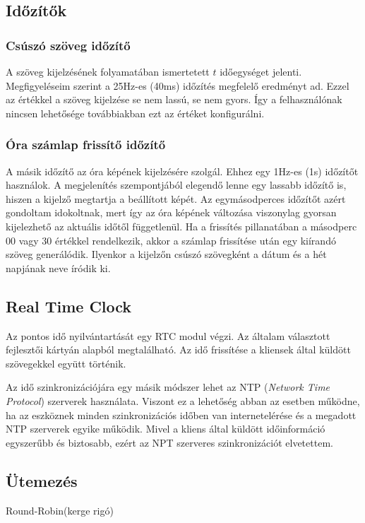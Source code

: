 \documentclass[a4paper, 12pt]{article}
\begin{document}
\subsection{Időzítők}

\subsubsection{Csúszó szöveg időzítő}
A szöveg kijelzésének folyamatában ismertetett $t$ időegységet jelenti. Megfigyeléseim szerint a 25Hz-es (40ms) időzítés megfelelő eredményt ad. Ezzel az értékkel a szöveg kijelzése se nem lassú, se nem gyors. Így a felhasználónak nincsen lehetősége továbbiakban ezt az értéket konfigurálni.

\subsubsection{Óra számlap frissítő időzítő}
A másik időzítő az óra képének kijelzésére szolgál. Ehhez egy 1Hz-es (1s) időzítőt használok. A megjelenítés szempontjából elegendő lenne egy lassabb időzítő is, hiszen a kijelző megtartja a beállított képét. Az egymásodperces időzítőt azért gondoltam idokoltnak, mert így az óra képének változása viszonylag gyorsan kijelezhető az aktuális időtől függetlenül.
Ha a frissítés pillanatában a másodperc 00 vagy 30 értékkel rendelkezik, akkor a számlap frissítése után egy kiírandó szöveg generálódik. Ilyenkor a kijelzőn csúszó szövegként a dátum és a hét napjának neve íródik ki.

\subsection{Real Time Clock}
Az pontos idő nyilvántartását egy RTC modul végzi. Az általam választott fejlesztői kártyán alapból megtalálható.
Az idő frissítése a kliensek által küldött szövegekkel együtt történik.

Az idő szinkronizációjára egy másik módszer lehet az NTP (\textit{Network Time Protocol}) szerverek használata. Viszont ez a lehetőség abban az esetben működne, ha az eszköznek minden szinkronizációs időben van internetelérése és a megadott NTP szerverek egyike működik.
Mivel a kliens által küldött időinformáció egyszerűbb és biztosabb, ezért az NPT szerveres szinkronizációt elvetettem.

\subsection{Ütemezés}
Round-Robin(kerge rigó)
\end{document}
